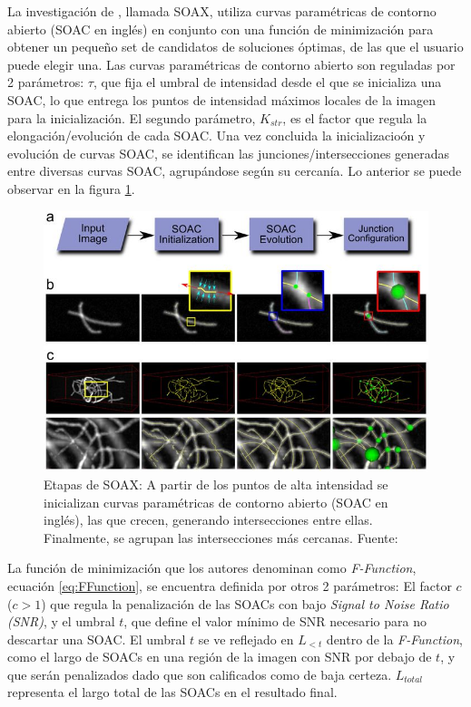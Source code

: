 \smallskip
La investigaci\'on de \cite{xu2015soax}, llamada SOAX, utiliza curvas param\'etricas de contorno abierto (SOAC en ingl\'es) en conjunto con una funci\'on de minimizaci\'on para obtener un peque\~no set de candidatos de soluciones \'optimas, de las que el usuario puede elegir una. Las curvas param\'etricas de contorno abierto son reguladas por 2 par\'ametros: $\tau$, que fija el umbral de intensidad desde el que se inicializa una SOAC, lo que entrega los puntos de intensidad m\'aximos locales de la imagen para la inicializaci\'on. El segundo par\'ametro, $K_{str}$, es el factor que regula la elongaci\'on/evoluci\'on de cada SOAC. Una vez concluida la inicializacio\'on y evoluci\'on de curvas SOAC, se identifican las junciones/intersecciones generadas entre diversas curvas SOAC, agrup\'andose seg\'un su cercan\'ia. Lo anterior se puede observar en la figura \ref{fig:SOAX}.

\begin{figure}[h]
        \centering
        \includegraphics[scale=0.75]{imagenes/SOAX.jpg}
        \caption{Etapas de SOAX: A partir de los puntos de alta intensidad se inicializan curvas param\'etricas de contorno abierto (SOAC en ingl\'es), las que crecen, generando intersecciones entre ellas. Finalmente, se agrupan las intersecciones más cercanas. Fuente: \cite{xu2015soax}}
        \label{fig:SOAX}
\end{figure}

La funci\'on de minimizaci\'on que los autores denominan como  \textit{F-Function}, ecuaci\'on \eqref{eq:FFunction}, se encuentra definida por otros 2 par\'ametros: El factor $c$ ($c > 1$) que regula la penalizaci\'on de las SOACs con bajo \textit{Signal to Noise Ratio (SNR)}, y el umbral $t$, que define el valor mínimo de SNR necesario para no descartar una SOAC. El umbral $t$ se ve reflejado en $L_{<t}$ dentro de la \textit{F-Function}, como el largo de SOACs en una regi\'on de la imagen con SNR por debajo de $t$, y que ser\'an penalizados dado que son calificados como de baja certeza. $L_{total}$ representa el largo total de las SOACs en el resultado final.

